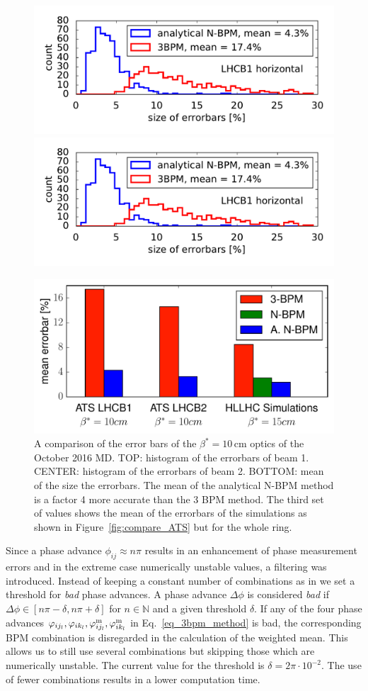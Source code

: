 \begin{figure}
	\centering
	\includegraphics[width=.49\linewidth]{comparison_errorbars_Beam1}
	\includegraphics[width=.49\linewidth]{comparison_errorbars_Beam2}
	
	\includegraphics[width=.7\linewidth]{mean_errorbars}
	
	\caption{
        A comparison of the error bars of the $ \beta^*=10\,\text{cm} $ optics of the October 2016 MD.
        TOP: histogram of the errorbars of beam 1. CENTER: histogram of the errorbars of beam 2.
        BOTTOM: mean of the size the errorbars. The mean of the analytical N-BPM method is a factor
        4 more accurate than the 3 BPM method. The third set of values shows the mean of the errorbars
        of the simulations as shown in Figure~\ref{fig:compare_ATS} but for the whole ring.
        }
	\label{fig:HL_report/comparison_errorbars}
\end{figure}
%
Since a phase advance $ \phi_{ij} \approx n\pi $ results in an enhancement of phase measurement errors and in the extreme case numerically unstable values, a filtering was introduced. Instead of keeping a constant number of combinations as in \cite{LangnerNBPM} we set a threshold for \emph{bad} phase advances. A phase advance $ \Delta \phi $ is considered \emph{bad} if $ \Delta \phi \in [ n\pi - \delta, n\pi + \delta ] $ for $ n\in \mathbb{N} $ and a given threshold $ \delta $. If any of the four phase advances $ \varphi_{ij_l}, \varphi_{ik_l},\varphi_{ij_l}^\text{m},\varphi_{ik_l}^\text{m} $ in Eq.~\eqref{eq_3bpm_method} is bad, the corresponding BPM combination is disregarded in the calculation of the weighted mean. This allows us to still use several combinations but skipping those which are numerically unstable. The current value for the threshold is $ \delta = 2\pi \cdot 10^{-2}$. The use of fewer combinations results in a lower computation time. 


